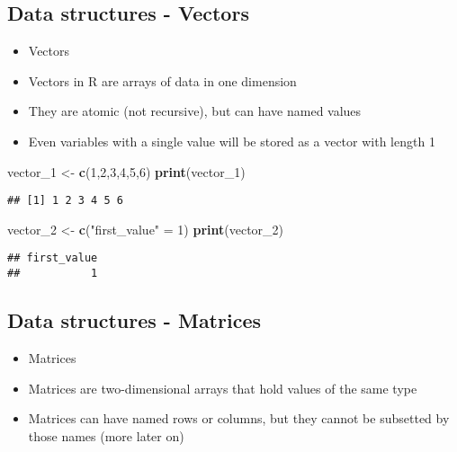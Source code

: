 \documentclass[]{article}
\newenvironment{Shaded}{\begin{snugshade}}{\end{snugshade}}
\newcommand{\KeywordTok}[1]{\textcolor[rgb]{0.13,0.29,0.53}{\textbf{#1}}}
\newcommand{\DecValTok}[1]{\textcolor[rgb]{0.00,0.00,0.81}{#1}}
\newcommand{\StringTok}[1]{\textcolor[rgb]{0.31,0.60,0.02}{#1}}
\newcommand{\NormalTok}[1]{#1}
\providecommand{\tightlist}{%
  \setlength{\itemsep}{0pt}\setlength{\parskip}{0pt}}
\begin{document}
\subsection{Data structures - Vectors}\label{data-structures---vectors}

\begin{itemize}
\tightlist
\item
  Vectors
\item
  Vectors in R are arrays of data in one dimension
\item
  They are atomic (not recursive), but can have named values
\item
  Even variables with a single value will be stored as a vector with
  length 1
\end{itemize}

\begin{Shaded}
\begin{Highlighting}[]
\NormalTok{vector_}\DecValTok{1}\NormalTok{ <-}\StringTok{ }\KeywordTok{c}\NormalTok{(}\DecValTok{1}\NormalTok{,}\DecValTok{2}\NormalTok{,}\DecValTok{3}\NormalTok{,}\DecValTok{4}\NormalTok{,}\DecValTok{5}\NormalTok{,}\DecValTok{6}\NormalTok{)}
\KeywordTok{print}\NormalTok{(vector_}\DecValTok{1}\NormalTok{)}
\end{Highlighting}
\end{Shaded}

\begin{verbatim}
## [1] 1 2 3 4 5 6
\end{verbatim}

\begin{Shaded}
\begin{Highlighting}[]
\NormalTok{vector_}\DecValTok{2}\NormalTok{ <-}\StringTok{ }\KeywordTok{c}\NormalTok{(}\StringTok{"first_value"}\NormalTok{ =}\StringTok{ }\DecValTok{1}\NormalTok{)}
\KeywordTok{print}\NormalTok{(vector_}\DecValTok{2}\NormalTok{)}
\end{Highlighting}
\end{Shaded}

\begin{verbatim}
## first_value 
##           1
\end{verbatim}

\subsection{Data structures -
Matrices}\label{data-structures---matrices}

\begin{itemize}
\tightlist
\item
  Matrices
\item
  Matrices are two-dimensional arrays that hold values of the same type
\item
  Matrices can have named rows or columns, but they cannot be subsetted
  by those names (more later on)
\end{itemize}
\end{document}
